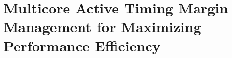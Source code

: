 
\chapter{Multicore Active Timing Margin Management for Maximizing Performance Efficiency}
\label{sec:process}